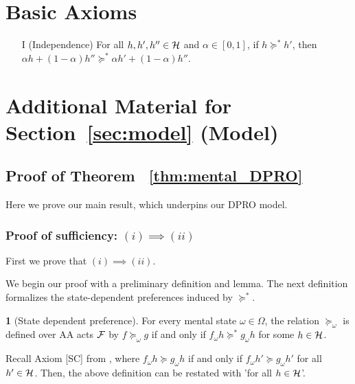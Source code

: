 \documentclass[11pt,oneside]{article}
\theoremstyle{plain}
\theoremstyle{plain}
\theoremstyle{plain}
\theoremstyle{plain}
\theoremstyle{plain}
\theoremstyle{definition}
\newtheorem{defn}[thm]{\protect\definitionname}
\theoremstyle{definition}
\theoremstyle{remark}
\theoremstyle{plain}
\providecommand{\definitionname}{Definition}
\newcommand{\F}{{\cal F}}
\newcommand{\pf}{\succeq}
\newcommand{\pfs}{\succeq^*}
\newcommand{\convmix}[2]{\alpha #1 + (1-\alpha) #2}
\newcommand{\omix}[2]{#1_\omega #2 }
\begin{document}
\section{Basic Axioms}
\label{sec:appendix_axioms}
\begin{itemize}
    \item [I] (Independence) For all $h,h',h'' \in {\cal H}$ and $\alpha \in [0,1]$, if $h \pfs h'$, then $\convmix{h}{h''} \pfs \convmix{h'}{h''}$.
\end{itemize}

\section{Additional Material for Section~\ref{sec:model} (Model)}

\subsection{Proof of Theorem ~\ref{thm:mental_DPRO}}
Here we prove our main result, which underpins our DPRO model.
\subsubsection{Proof of sufficiency: $(i) \implies (ii)$}
First we prove that $(i) \implies (ii)$.

We begin our proof with a preliminary definition and lemma. The next definition formalizes the state-dependent preferences induced by $\pfs$.

\begin{defn}[State dependent preference]
\label{defn:state_dep_preference}
For every mental state $\omega\in \Omega$, the relation $\pf_\omega$ is defined over AA acts $\F$ by $f\pf_\omega g$ if and only if $\omix{f}{h} \pfs \omix{g}{h}$ for some $h \in {\cal H}$.
\end{defn}

Recall Axiom [SC] from \cite{hill2019non}, where $f_\omega h\pf g_\omega h$ if and only if $\omix{f}{h'} \pf \omix{g}{h'}$ for all $h' \in {\cal H}$. Then, the above definition can be restated with 'for all $h \in {\cal H}$'.
\end{document}
